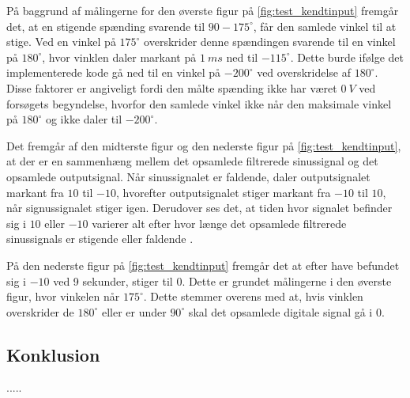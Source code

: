 På baggrund af målingerne for den øverste figur på \autoref{fig:test_kendtinput} fremgår det, at en stigende spænding svarende til $90-175^{\circ}$, får den samlede vinkel til at stige. Ved en vinkel på $175^{\circ}$ overskrider denne spændingen svarende til en vinkel på $180^{\circ}$, hvor vinklen daler markant på $1~ms$ ned til $-115^{\circ}$. 
Dette burde ifølge det implementerede kode gå ned til en vinkel på $-200^{\circ}$ ved overskridelse af $180^{\circ}$.
Disse faktorer er angiveligt fordi den målte spænding ikke har været $0~V$ ved forsøgets begyndelse, hvorfor den samlede vinkel ikke når den maksimale vinkel på $180^{\circ}$ og ikke daler til $-200^{\circ}$.

Det fremgår af den midterste figur og den nederste figur på \autoref{fig:test_kendtinput}, at der er en sammenhæng mellem det opsamlede filtrerede sinussignal og det opsamlede outputsignal. Når sinussignalet er faldende, daler outputsignalet markant fra $10$ til $-10$, hvorefter outputsignalet stiger markant fra $-10$ til $10$, når signussignalet stiger igen. Derudover ses det, at tiden hvor signalet befinder sig i $10$ eller $-10$ varierer alt efter hvor længe det opsamlede filtrerede sinussignals er stigende eller faldende .

På den nederste figur på \autoref{fig:test_kendtinput} fremgår det at efter have befundet sig i $-10$ ved 9 sekunder, stiger til $0$. Dette er grundet målingerne i den øverste figur, hvor vinkelen når $175^{\circ}$. Dette stemmer overens med at, hvis vinklen overskrider de $180^{\circ}$ eller er under $90^{\circ}$ skal det opsamlede digitale signal gå i $0$. 

\subsection{Konklusion}
.....
